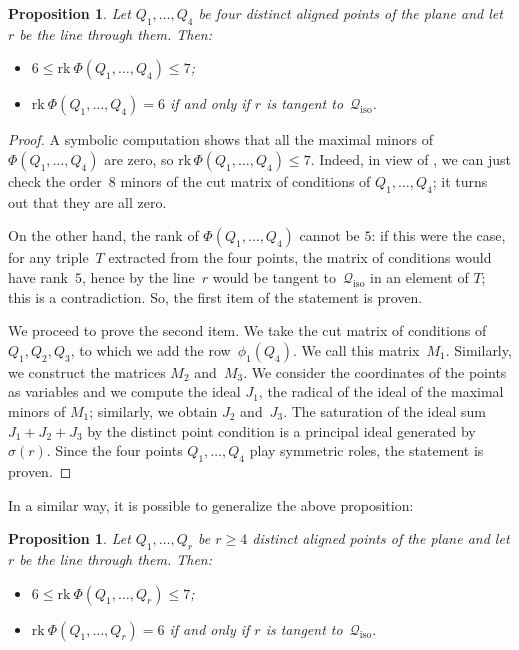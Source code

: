 \documentclass{amsart}
\theoremstyle{plain}
\newtheorem{prop}[lemma]{Proposition}
\theoremstyle{definition}
\newcommand{\iso}{\mathcal{Q}_{\mathrm{iso}}}
\newcommand{\rk}{\ensuremath{\mathrm{rk}}}
\begin{document}
\begin{prop}
\label{proposition:four_aligned}
Let $Q_1, \dotsc, Q_4$ be four distinct aligned points of the plane and
let $r$ be the line through them. Then:
\begin{itemize}
\item $6 \leq \rk  \ \Phi(Q_1, \dotsc, Q_4) \leq 7$;
\item $\rk  \ \Phi(Q_1, \dotsc, Q_4) = 6$ if and only if $r$ is tangent
to~$\iso$.
\end{itemize}
\end{prop}
\begin{proof}
  A symbolic computation shows that all the maximal minors of~$\Phi(Q_1, \dotsc, Q_4)$ are
  zero, so
  \mbox{$\rk \, \Phi(Q_1, \dotsc, Q_4) \leq 7$}.
  Indeed, in view of , we can just check the order~$8$ minors of the cut matrix of conditions of $Q_1, \dotsc, Q_4$; it turns out that they are all zero.

  On the other hand, the rank of $\Phi(Q_1, \dotsc, Q_4)$ cannot be $5$:
  if this were the case, for any triple~$T$ extracted from the four points, the matrix of conditions would have rank~$5$, hence by  the line~$r$ would be tangent to~$\iso$ in an element of $T$; this is a contradiction.
  So, the first item of the statement is proven.

  We proceed to prove the second item.
  We take the cut matrix of conditions of~$Q_1, Q_2, Q_3$, to which we add the row~$\phi_1(Q_4)$.
  We call this matrix~$M_1$.
  Similarly, we construct the matrices $M_2$ and~$M_3$.
  We consider the coordinates of the points as variables and we compute
  the ideal $J_1$, the radical of the ideal of the maximal minors of $M_1$; similarly, we obtain $J_2$ and~$J_3$.
  The saturation of the ideal sum $J_1 + J_2 + J_3$ by the distinct point condition is a principal ideal generated by~$\sigma(r)$.
  Since the four points $Q_1, \dotsc, Q_4$ play symmetric roles, the statement is proven.
\end{proof}

In a similar way, it is possible to generalize the above proposition:
\begin{prop}
\label{proposition:n_aligned}
Let $Q_1, \dotsc, Q_r$ be $r\geq 4$ distinct aligned points of the plane and
let $r$ be the line through them. Then:
\begin{itemize}
\item $6 \leq \rk  \ \Phi(Q_1, \dotsc, Q_r) \leq 7$;
\item $\rk  \ \Phi(Q_1, \dotsc, Q_r) = 6$ if and only if $r$ is tangent
to~$\iso$.
\end{itemize}
\end{prop}
\end{document}
